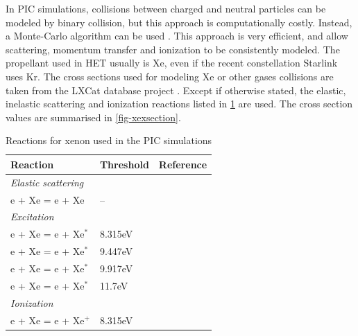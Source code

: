     In \ac{PIC} simulations, collisions between charged and neutral particles can be modeled by binary collision, but this approach is computationally costly.
    Instead, a Monte-Carlo algorithm can be used \cite{vahedi1995}.
    This approach is very efficient, and allow scattering, momentum transfer and ionization to be consistently modeled.
    The propellant used in \ac{HET} usually is \ac{Xe}, even if the recent constellation Starlink uses \ac{Kr}.
    The cross sections used for modeling \ac{Xe} or other gases collisions are taken from the {\sc LXCat} database project \cite{LXCat_web}.
    Except if otherwise stated, the elastic, inelastic scattering and ionization reactions listed in \cref{tab-reactXe} are used.
    The cross section values are summarised in \cref{fig-xexsection}.

    \begin{table}[hbtp]
      \centering
      \caption{Reactions for xenon used in the PIC simulations}
      \label{tab-reactXe}
      \begin{tabular}{@{}lll@{}}  \toprule
        Reaction & Threshold & Reference\\ \midrule
        {\it Elastic scattering} & &\\
        e + Xe = e + Xe   & --   & \cite{Lxcat_Xe,Lxcat_Xe2} \\
        {\it Excitation} & &\\
        e + Xe = e + Xe$^*$   & 8.315eV   & \cite{Lxcat_Xe,Lxcat_Xe2} \\
        e + Xe = e + Xe$^*$   & 9.447eV   & \cite{Lxcat_Xe,Lxcat_Xe2} \\
        e + Xe = e + Xe$^*$   & 9.917eV   & \cite{Lxcat_Xe,Lxcat_Xe2} \\
        e + Xe = e + Xe$^*$   & 11.7eV    & \cite{Lxcat_Xe,Lxcat_Xe2} \\
        {\it Ionization} & &\\
        e + Xe = e + Xe$^+$   & 8.315eV   & \cite{Lxcat_Xe,Lxcat_Xe2} \\
        \bottomrule
      \end{tabular}
    \end{table}



